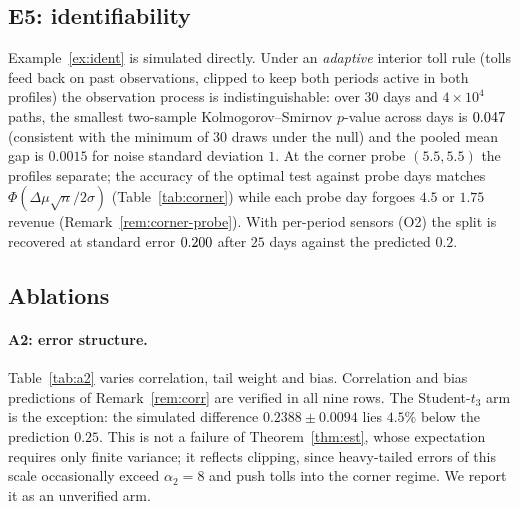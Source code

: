 \documentclass[11pt]{article}
\theoremstyle{definition}
\theoremstyle{remark}
\begin{document}
\begin{expsec}
\subsection{E5: identifiability}
Example~\ref{ex:ident} is simulated directly. Under an \emph{adaptive} interior toll rule (tolls feed back on past observations, clipped to keep both periods active in both profiles) the observation process is indistinguishable: over $30$ days and $4\times10^4$ paths, the smallest two-sample Kolmogorov--Smirnov $p$-value across days is $0.047$ (consistent with the minimum of $30$ draws under the null) and the pooled mean gap is $0.0015$ for noise standard deviation $1$. At the corner probe $(5.5,5.5)$ the profiles separate; the accuracy of the optimal test against probe days matches $\Phi(\Delta\mu\sqrt n/2\sigma)$ (Table~\ref{tab:corner}) while each probe day forgoes $4.5$ or $1.75$ revenue (Remark~\ref{rem:corner-probe}). With per-period sensors (O2) the split is recovered at standard error $0.200$ after $25$ days against the predicted $0.2$.
\begin{table}[t]\centering\small
\caption{E5. Accuracy of the likelihood-ratio test between $\alpha=(10,6)$ and $\alpha'=(11,5)$ from $n$ days of corner probes, $\sigma=1$ ($10^5$ replications).}\label{tab:corner}\end{table}

\subsection{Ablations}
\paragraph{A2: error structure.} Table~\ref{tab:a2} varies correlation, tail weight and bias. Correlation and bias predictions of Remark~\ref{rem:corr} are verified in all nine rows. The Student-$t_3$ arm is the exception: the simulated difference $0.2388\pm0.0094$ lies $4.5\%$ below the prediction $0.25$. This is not a failure of Theorem~\ref{thm:est}, whose expectation requires only finite variance; it reflects clipping, since heavy-tailed errors of this scale occasionally exceed $\alpha_2=8$ and push tolls into the corner regime. We report it as an unverified arm.
\begin{table}[t]\centering\small
\caption{A2. Ablation over error structure, $\alpha=(10,8)$, $\sigma_\alpha=1$, $10^6$ draws.}\label{tab:a2}\end{table}

\end{expsec}
\end{document}

